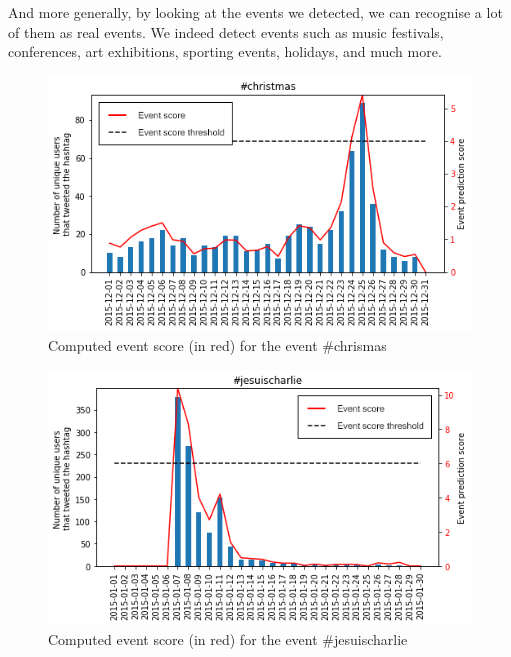 \documentclass[11pt]{article}
\begin{document}
And more generally, by looking at the events we detected, we can recognise a lot of them as real events. We indeed detect events such as music festivals, conferences, art exhibitions, sporting events, holidays, and much more.
\begin{figure}[htbp]
  \vspace*{-1mm}
  \centering
  \includegraphics[width=\columnwidth]{figures/christmas_result.png}
  \vspace{-5mm}
  \caption{Computed event score (in red) for the event \#chrismas}
  \label{fig:christmas}
\end{figure}

\begin{figure}[htbp]
  \vspace*{-1mm}
  \centering
  \includegraphics[width=\columnwidth]{figures/jesuischarlie_result.png}
  \vspace{-5mm}
  \caption{Computed event score (in red) for the event \#jesuischarlie}
  \label{fig:jesuischarlie}
\end{figure}
\end{document}
